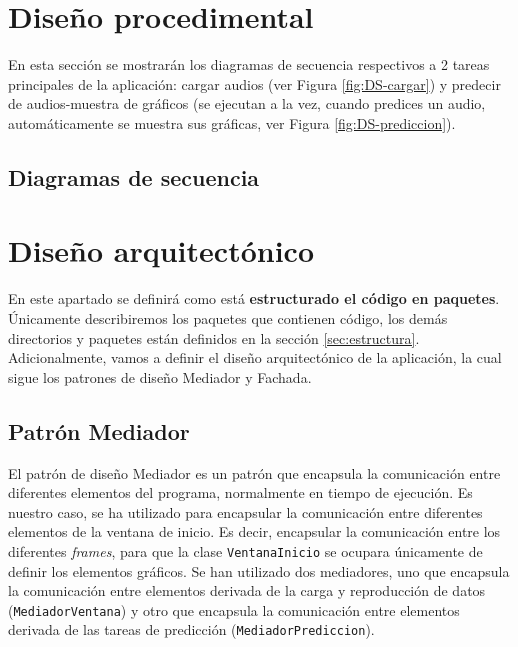 \section{Diseño procedimental}
En esta sección se mostrarán los diagramas de secuencia respectivos a 2 tareas principales de la aplicación: cargar audios (ver Figura \ref{fig:DS-cargar}) y predecir de audios-muestra de gráficos (se ejecutan a la vez, cuando predices un audio, automáticamente se muestra sus gráficas, ver Figura \ref{fig:DS-prediccion}).
\subsection{Diagramas de secuencia}



\section{Diseño arquitectónico}
En este apartado se definirá como está \textbf{estructurado el código en paquetes}. Únicamente describiremos los paquetes que contienen código, los demás directorios y paquetes están definidos en la sección \ref{sec:estructura}. Adicionalmente, vamos a definir el diseño arquitectónico de la aplicación, la cual sigue los patrones de diseño Mediador y Fachada.

\subsection{Patrón Mediador}
El patrón de diseño Mediador es un patrón que encapsula la comunicación entre diferentes elementos del programa, normalmente en tiempo de ejecución. \cite{wiki:mediador} Es nuestro caso, se ha utilizado para encapsular la comunicación entre diferentes elementos de la ventana de inicio. Es decir, encapsular la comunicación entre los diferentes \textit{frames}, para que la clase \texttt{VentanaInicio} se ocupara únicamente de definir los elementos gráficos. Se han utilizado dos mediadores, uno que encapsula la comunicación entre elementos derivada de la carga y reproducción de datos (\texttt{MediadorVentana}) y otro que encapsula la comunicación entre elementos derivada de las tareas de predicción (\texttt{MediadorPrediccion}).

